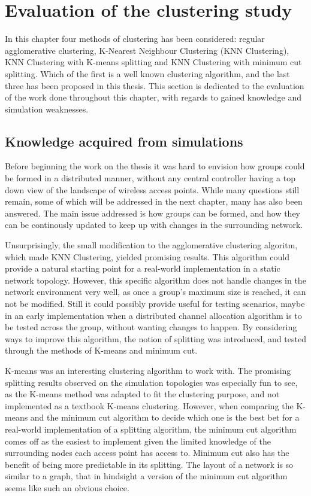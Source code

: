\section{Evaluation of the clustering study}
In this chapter four methods of clustering has been considered: regular agglomerative clustering, K-Nearest Neighbour Clustering (KNN Clustering), KNN Clustering with K-means splitting
and KNN Clustering with minimum cut splitting. Which of the first is a well known clustering algorithm, and the last three has been proposed in this thesis. 
This section is dedicated to the evaluation of the work done throughout this chapter, with regards to gained knowledge and simulation weaknesses.

\subsection{Knowledge acquired from simulations}
Before beginning the work on the thesis it was hard to envision how groups could be formed in a distributed manner, without any central controller having a top down view of
the landscape of wireless access points. While many questions still remain, some of which will be addressed in the next chapter, many has also been answered. The main issue
addressed is how groups can be formed, and how they can be continously updated to keep up with changes in the surrounding network.  

Unsurprisingly, the small modification to the agglomerative clustering algoritm, which made KNN Clustering, yielded promising results.
This algorithm could provide a natural starting point for a real-world implementation in a static network topology.
However, this specific algorithm does not handle changes in the network environment very well, as once a group's maximum size is reached, it can not be modified. 
Still it could possibly provide useful for testing scenarios, maybe in an early implementation when a distributed channel allocation algorithm is to be tested across the group, without
wanting changes to happen. By considering ways to improve this algorithm, the notion of splitting was introduced, and tested through the methods of K-means and minimum cut.

K-means was an interesting clustering algorithm to work with. The promising splitting results observed on the simulation topologies was especially fun to see, as
the K-means method was adapted to fit the clustering purpose, and not implemented as a textbook K-means clustering.
However, when comparing the K-means and the minimum cut algorithm to decide which one is the best bet for a real-world implementation of a splitting algorithm,
the minimum cut algorithm comes off as the easiest to implement given the limited knowledge of the surrounding nodes each access point has access to. 
Minimum cut also has the benefit of being more predictable in its splitting. The layout of a network is so similar to a graph,
that in hindsight a version of the minimum cut algorithm seems like such an obvious choice. 

